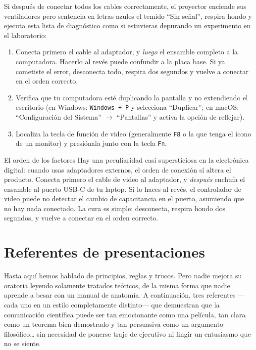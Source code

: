 Si después de conectar todos los cables correctamente, el proyector enciende sus ventiladores pero sentencia en letras azules el temido “Sin señal”, respira hondo y ejecuta esta lista de diagnóstico como si estuvieras depurando un experimento en el laboratorio:

\begin{enumerate}
	\item Conecta primero el cable al adaptador, y \emph{luego} el ensamble completo a la computadora.
	      Hacerlo al revés puede confundir a la placa base.
	      Si ya cometiste el error, desconecta todo, respira dos segundos y vuelve a conectar en el orden correcto.
	\item Verifica que tu computadora esté duplicando la pantalla y no extendiendo el escritorio (en Windows: \texttt{Windows + P} y selecciona “Duplicar”; en macOS: “Configuración del Sistema” \(\to\) “Pantallas” y activa la opción de reflejar).
	\item Localiza la tecla de función de video (generalmente \texttt{F8} o la que tenga el ícono de un monitor) y presiónala junto con la tecla \texttt{Fn}.
\end{enumerate}

\begin{digress}{El orden de los factores}
	Hay una peculiaridad casi supersticiosa en la electrónica digital: cuando usas adaptadores externos, el orden de conexión sí altera el producto.
	Conecta primero el cable de video al adaptador, y \emph{después} enchufa el ensamble al puerto USB-C de tu laptop.
	Si lo haces al revés, el controlador de video puede no detectar el cambio de capacitancia en el puerto, asumiendo que no hay nada conectado.
	La cura es simple: desconecta, respira hondo dos segundos, y vuelve a conectar en el orden correcto.
\end{digress}

\section{Referentes de presentaciones}
\label{sec:referentes}

Hasta aquí hemos hablado de principios, reglas y trucos.
Pero nadie mejora su oratoria leyendo solamente tratados teóricos, de la misma forma que nadie aprende a besar con un manual de anatomía.
A continuación, tres referentes —cada uno en un estilo completamente distinto— que demuestran que la comunicación científica puede ser tan emocionante como una película, tan clara como un teorema bien demostrado y tan persuasiva como un argumento filosófico\ldots{} sin necesidad de ponerse traje de ejecutivo ni fingir un entusiasmo que no se siente.

